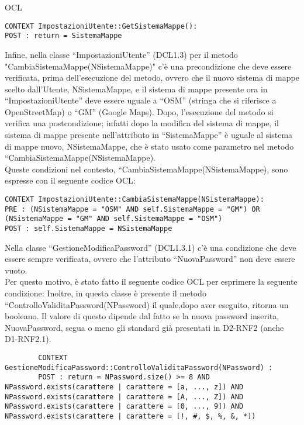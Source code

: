 \begin{listaPersonale}{OCL}
\begin{lstlisting}
CONTEXT ImpostazioniUtente::GetSistemaMappe():
POST : return = SistemaMappe 
    \end{lstlisting}
    Infine, nella classe “ImpostazioniUtente” (DCL1.3) per il metodo \\ "CambiaSistemaMappe(NSistemaMappe)" c'è una precondizione che deve essere verificata, prima dell'esecuzione del metodo, ovvero che il nuovo sistema di mappe scelto dall'Utente, NSistemaMappe, e il sistema di mappe presente ora in “ImpostazioniUtente” deve essere uguale a “OSM” (stringa che si riferisce a OpenStreetMap) o “GM” (Google Maps).
    Dopo, l'esecuzione del metodo si verifica una postcondizione; infatti dopo la modifica del sistema di mappe, il sistema di mappe presente nell'attributo in “SistemaMappe” è uguale al sistema di mappe nuovo, NSistemaMappe, che è stato usato come parametro nel metodo “CambiaSistemaMappe(NSistemaMappe).\\
    Queste condizioni nel contesto, “CambiaSistemaMappe(NSistemaMappe), sono espresse con il seguente codice OCL:

    \begin{lstlisting}
CONTEXT ImpostazioniUtente::CambiaSistemaMappe(NSistemaMappe):
PRE : (NSistemaMappe = "OSM" AND self.SistemaMappe = "GM") OR (NSistemaMappe = "GM" AND self.SistemaMappe = "OSM")
POST : self.SistemaMappe = NSistemaMappe
    \end{lstlisting}




    Nella classe “GestioneModificaPassword” (DCL1.3.1) c'è una condizione che deve essere sempre verificata, ovvero che l'attributo “NuovaPassword” non deve essere vuoto. \\
    Per questo motivo, è stato fatto il seguente codice OCL per esprimere la seguente condizione:
    Inoltre, in questa classe è presente il metodo “ControlloValiditaPassword(NPassword) il quale,dopo aver eseguito, ritorna un booleano. Il valore di questo dipende dal fatto se la nuova password inserita, NuovaPassword, segua o meno gli standard già presentati in D2-RNF2 (anche D1-RNF2.1).
    \begin{lstlisting}
        CONTEXT GestioneModificaPassword::ControlloValiditaPassword(NPassword) :
        POST : return = NPassword.size() >= 8 AND NPassword.exists(carattere | carattere = [a, ..., z]) AND NPassword.exists(carattere | carattere = [A, ..., Z]) AND NPassword.exists(carattere | carattere = [0, ..., 9]) AND NPassword.exists(carattere | carattere = [!, #, $, %, &, *])
    \end{lstlisting}


\end{listaPersonale}
